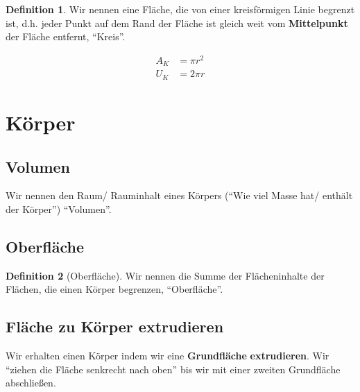 \documentclass[a4paper]{book}%
\theoremstyle{definition}
\newtheorem{definition}{Definition}
\begin{document}
\begin{definition}
    Wir nennen eine Fläche, die von einer kreisförmigen Linie begrenzt ist, d.h. jeder Punkt auf dem Rand der Fläche ist gleich weit vom \textbf{Mittelpunkt} der Fläche entfernt, \enquote{Kreis}.
\end{definition}

\begin{align}\label{eqn:Kreis}
  A_K &= \pi r^2 \\
  U_K &= 2 \pi r
\end{align}



\section{Körper}

\subsection{Volumen}\label{Volumen}

Wir nennen den Raum/ Rauminhalt eines Körpers (\enquote{Wie viel Masse hat/ enthält der Körper}) \enquote{Volumen}.


\subsection{Oberfläche}\label{Oberfläche}

\begin{definition}[Oberfläche]
    Wir nennen die Summe der Flächeninhalte der Flächen, die einen Körper begrenzen, \enquote{Oberfläche}.
\end{definition}


\subsection{Fläche zu Körper extrudieren}\label{Extrudieren}

Wir erhalten einen Körper indem wir eine \textbf{Grundfläche} \textbf{extrudieren}. Wir \enquote{ziehen die Fläche senkrecht nach oben} bis wir mit einer zweiten Grundfläche abschließen.
\end{document}
